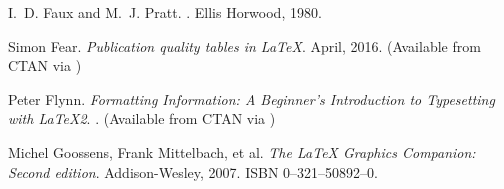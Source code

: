\begin{thebibliography}{GMS94A}
I.~D. Faux and M.~J. Pratt.
.
\newblock Ellis Horwood, 1980.



  Simon Fear.
  \newblock \emph{Publication quality tables in LaTeX}.
  \newblock April, 2016.
  \newblock (Available from CTAN via
            )

\begin{comment}
\bibitem[Fli98]{LETTRINE}
  Daniel Flipo.
  \newblock \emph{Typesetting `lettrines' in LaTeX2e documents}.
  \newblock March, 1998.
  \newblock (Available from CTAN in
             \url{/macros/latex/contrib/lettrine})
\end{comment}

  Peter Flynn.
  \newblock \emph{Formatting Information: A Beginner's Introduction to 
                  Typesetting with LaTeX2}.
  .
  \newblock (Available from CTAN via 
             )

\begin{comment}
\bibitem[Fra00]{CROP}
  Melchior Franz.
  \newblock \emph{The crop package}.
  \newblock February, 2000.
  \newblock (Available from CTAN in 
             \url{/macros/latex/contrib/crop})

\bibitem[FOS98]{FRIEDL98}
  Friedrich Friedl, Nicolaus Ott and Bernard Stein.
  \newblock \emph{Typography: An Encyclopedic Survey of Type Designs and
                  Techniques throughout History}.
  \newblock Black Dog \& Leventhal Publishers Inc., 1998.
  \newblock ISBN 1--57912--023--7.

\bibitem[Gar66]{GARDNER66}
  Martin Gardner.
  \newblock \emph{More Mathematical Puzzles and Diversions}.
  \newblock Penguin Books, 1996.
  \newblock ISBN 0--14--020748--1.
\end{comment}


  Michel Goossens, Frank Mittelbach, et al.
  \newblock \emph{The LaTeX Graphics Companion: Second edition}.
  \newblock Addison-Wesley, 2007.
  \newblock ISBN 0--321--50892--0.


\end{thebibliography}
